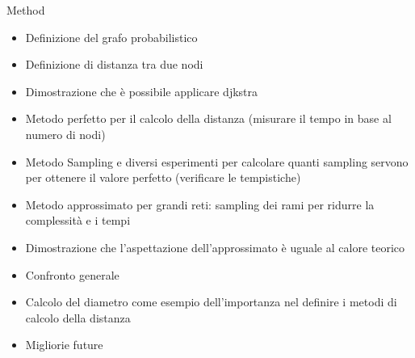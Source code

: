 \begin{projsection}{Method}
	\begin{itemize}
		\item Definizione del grafo probabilistico
		\item Definizione di distanza tra due nodi
		\item Dimostrazione che è possibile applicare djkstra
		\item Metodo perfetto per il calcolo della distanza (misurare il tempo in base al numero di nodi)
		\item Metodo Sampling e diversi esperimenti per calcolare quanti sampling servono per ottenere il valore perfetto (verificare le tempistiche)
		\item Metodo approssimato per grandi reti: sampling dei rami per ridurre la complessità e i tempi
		\item Dimostrazione che l'aspettazione dell'approssimato è uguale al calore teorico
		\item Confronto generale
		\item Calcolo del diametro come esempio dell'importanza nel definire i metodi di calcolo della distanza
		\item Migliorie future
	\end{itemize}
\end{projsection}
